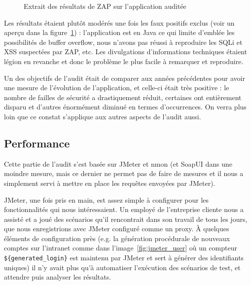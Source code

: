 \begin{figure}
  \centering
  \caption{Extrait des résultats de ZAP sur l'application auditée}
  \label{fig:zap_res}  
\end{figure}

Les résultats étaient plutôt modérés une fois les faux positifs exclus (voir un aperçu dans la figure~\ref{fig:zap_res}) : l'application est en Java ce qui limite d'emblée les possibilités de buffer overflow, nous n'avons pas réussi à reproduire les SQLi et XSS suspectées par ZAP, etc. Les divulgations d'informations techniques étaient légion en revanche et donc le problème le plus facile à remarquer et reproduire. 

Un des objectifs de l'audit était de comparer aux années précédentes pour avoir une mesure de l'évolution de l'application, et celle-ci était très positive : le nombre de failles de sécurité a drastiquement réduit, certaines ont entièrement disparu et d'autres énormément diminué en termes d'occurrences. On verra plus loin que ce constat s'applique aux autres aspects de l'audit aussi. 

\subsection{Performance}
Cette partie de l'audit s'est basée sur JMeter et nmon (et SoapUI dans une moindre mesure, mais ce dernier ne permet pas de faire de mesures et il nous a simplement servi à mettre en place les requêtes envoyées par JMeter). 

JMeter, une fois pris en main, est assez simple à configurer pour les fonctionnalités qui nous intéressaient. Un employé de l'entreprise cliente nous a assisté et a joué des scénarios qu'il rencontrait dans son travail de tous les jours, que nous enregistrions avec JMeter configuré comme un proxy. À quelques éléments de configuration près (e.g. la génération procédurale de nouveaux comptes sur l'intranet comme dans l'image~\ref{fig:jmeter_user} où un compteur \verb|${generated_login}| est maintenu par JMeter et sert à générer des identifiants uniques) il n'y avait plus qu'à automatiser l'exécution des scénarios de test, et attendre puis analyser les résultats. 

